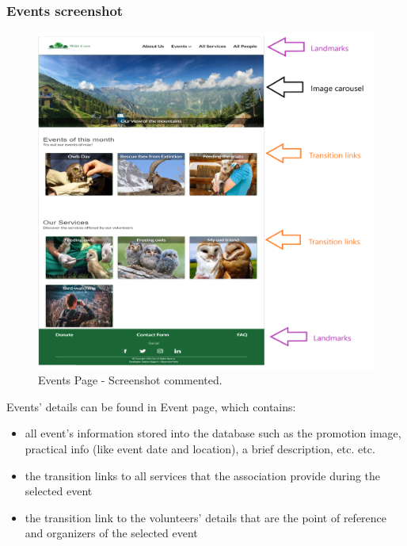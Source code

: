 \subsubsection{Events screenshot}
\begin{figure}[h!]
	\centering
	\begin{minipage}[b]{1\textwidth}
    		\includegraphics[width=\textwidth]{./assets/mockups/homepage_commented.png}
		\caption{Events Page - Screenshot commented.}
	\end{minipage}
\end{figure}
\FloatBarrier

\vspace{1cm}
\hspace{-1cm}
Events' details can be found in Event page, which contains:
\begin{itemize}
	\item all event's information stored into the database such as the promotion image, practical info (like event date and location),  			a brief description, etc. etc.
	\item the transition links to all services that the association provide during the selected event
	\item the transition link to the volunteers' details that are the point of reference and organizers of the selected event
\end{itemize} 

